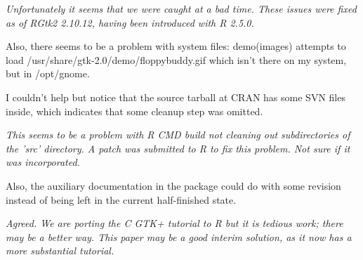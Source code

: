 \documentclass{article}
\begin{document}
\emph{Unfortunately it seems that we were caught at a bad time. These issues
were fixed as of RGtk2 2.10.12, having been introduced with R 2.5.0.}

Also, there
seems to be a problem with system files: demo(images) attempts to load
/usr/share/gtk-2.0/demo/floppybuddy.gif which isn't there on my system,
but in /opt/gnome.

I couldn't help but notice that the source tarball at CRAN has some SVN files
inside, which indicates that some cleanup step was omitted.

\emph{This seems to be a problem with R CMD build not cleaning out subdirectories
of the 'src' directory. A patch was submitted to R to fix this problem. Not sure
if it was incorporated.}

Also, the auxiliary documentation in the package could do with some revision
instead of being left in the current half-finished state.

\emph{Agreed. We are porting the C GTK+ tutorial to R but it is tedious work;
there may be a better way. This paper may be a good interim solution, as it now
has a more substantial tutorial.}
\end{document}
